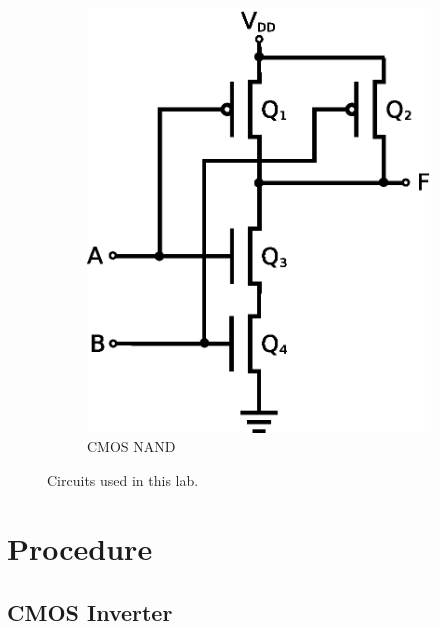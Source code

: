 \begin{figure}[hbtp]
\begin{subfigure}[b]{0.4\textwidth}
     \includegraphics[width=\textwidth]{nand}
     \caption{\label{schem:nand} CMOS NAND}
   \end{subfigure}
   \caption{\label{fig:schematics} Circuits used in this lab.}
 \end{figure}

\section{Procedure}
\label{sec:procedure}

\subsection{CMOS Inverter}
\label{sec:inverter}

